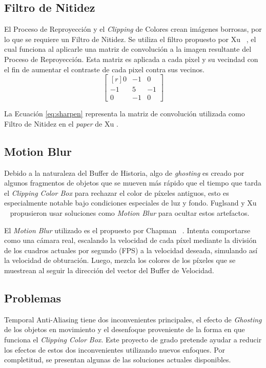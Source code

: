 \documentclass[pregrado]{tesis-usb} %
\begin{document}
\subsection{Filtro de Nitidez} 
El Proceso de Reproyección y el \textit{Clipping} de Colores crean imágenes borrosas, por lo que se requiere un Filtro de Nitidez. Se utiliza el filtro propuesto por Xu ~\cite{XU2016}, el cual funciona al aplicarle una matriz de convolución a la imagen resultante del Proceso de Reproyección. Esta matriz es aplicada a cada pixel y su vecindad con el fin de aumentar el contraste de cada pixel contra sus vecinos. 
\begin{equation} \label{eq:sharpen}
\begin{bmatrix*}[r]
0 & -1 &  0 \\
-1 &  5 & -1 \\
0 & -1 &  0
\end{bmatrix*}
\end{equation}

La Ecuación \ref{eq:sharpen} representa la matriz de convolución utilizada como Filtro de Nitidez en el \textit{paper} de Xu \protect\cite{XU2016}. 

\subsection{Motion Blur}
Debido a la naturaleza del Buffer de Historia, algo de \textit{ghosting} es creado por algunos fragmentos de objetos que se mueven más rápido que el tiempo que tarda el \textit{Clipping Color Box} para rechazar el color de píxeles antiguos, esto es especialmente notable bajo condiciones especiales de luz y fondo. Fuglsand y Xu ~\cite{Fuglsand2016, XU2016} propusieron usar soluciones como \textit{Motion Blur} para ocultar estos artefactos.

El \textit{Motion Blur} utilizado es el propuesto por Chapman ~\cite{Chapman2012}. Intenta comportarse como una cámara real, escalando la velocidad de cada píxel mediante la división de los cuadros actuales por segundo (FPS) a la velocidad deseada, simulando así la velocidad de obturación. Luego, mezcla los colores de los píxeles que se muestrean al seguir la dirección del vector del Buffer de Velocidad.


\subsection{Problemas}
Temporal Anti-Aliasing tiene dos inconvenientes principales, el efecto de \textit{Ghosting} de los objetos en movimiento y el desenfoque proveniente de la forma en que funciona el \textit{Clipping Color Box}. Este proyecto de grado pretende ayudar a reducir los efectos de estos dos inconvenientes utilizando nuevos enfoques. Por completitud, se presentan algunas de las soluciones actuales disponibles.
\end{document}

